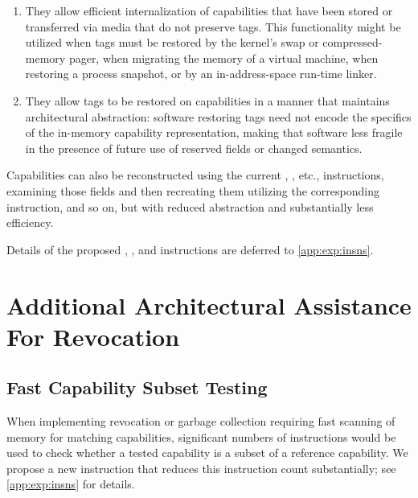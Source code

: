 \begin{enumerate}
\item They allow efficient internalization of capabilities that have been
  stored or transferred via media that do not preserve tags.
  This functionality might be utilized when tags must be restored by the
  kernel's swap or compressed-memory pager, when migrating the memory of a
  virtual machine, when restoring a process snapshot, or by an
  in-address-space run-time linker.

\item They allow tags to be restored on capabilities in a manner that
  maintains architectural abstraction: software restoring tags need not encode
  the specifics of the in-memory capability representation, making that
  software less fragile in the presence of future use of reserved fields or
  changed semantics.
\end{enumerate}

Capabilities can also be reconstructed using the current
, , etc., instructions, examining
those fields and then recreating them utilizing the corresponding
 instruction, and so on, but with reduced abstraction
and substantially less efficiency.

Details of the proposed , ,
and  instructions are deferred to \cref{app:exp:insns}.


\section{Additional Architectural Assistance For Revocation} %

\subsection{Fast Capability Subset Testing} %
\label{subsection:fast-capability-subset-testing}

When implementing revocation or garbage collection requiring fast scanning
of memory for matching capabilities, significant numbers of instructions
would be used to check whether a tested capability is a subset of a reference
capability.  We propose a new 
instruction that reduces this instruction count substantially; see
\cref{app:exp:insns} for details.


